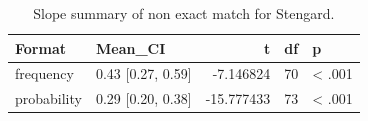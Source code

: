 \begin{table}
\centering
\caption{Slope summary of non exact match for Stengard.}
\centering
\fontsize{10}{12}\selectfont
\begin{tabular}[t]{llrrl}
\toprule
Format & Mean\_CI & t & df & p\\
\midrule
frequency & 0.43 [0.27, 0.59] & -7.146824 & 70 & < .001\\
probability & 0.29 [0.20, 0.38] & -15.777433 & 73 & < .001\\
\bottomrule
\end{tabular}
\end{table}
